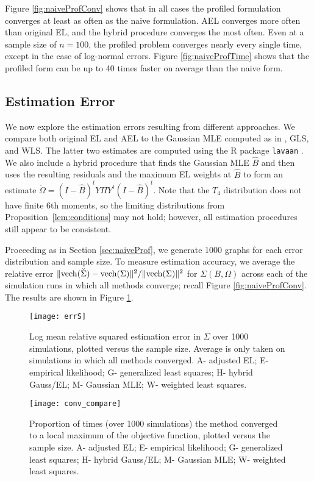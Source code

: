 \documentclass[notitlepage]{article}
\newcommand{\ve}{{\rm vech}}       %
\begin{document}
Figure \ref{fig:naiveProfConv} shows that in all cases the profiled
formulation converges at least as often as the naive formulation.  AEL
converges more often than original EL, and the hybrid procedure converges
the most often.  Even at a sample size of $n =100$, the profiled
problem converges nearly every single time, except in the case of
log-normal errors. Figure \ref{fig:naiveProfTime} shows that the profiled
form can be up to 40 times faster on average than the naive form.


\subsection{Estimation Error}

We now explore the estimation errors resulting from different
approaches.  We compare both original EL and AEL to the Gaussian MLE
computed as in \cite{drton2009computing}, GLS, and WLS.  The latter
two estimates are computed using the R package \texttt{lavaan}
\citep{lavaan}.  We also include a hybrid procedure that finds the
Gaussian MLE $\hat B$ and then uses the resulting residuals and the
maximum EL weights at $\hat B$ to form an estimate
$\check \Omega = (I - \hat B)^t Y \Pi Y ^t(I - \hat B)^t$.  Note that
the $T_4$ distribution does not have finite 6th moments, so the
limiting distributions from Proposition~\ref{lem:conditions} may not
hold; however, all estimation procedures still appear to be
consistent.

Proceeding as in Section \ref{sec:naiveProf}, we generate 1000 graphs
for each error distribution and sample size.  To measure estimation
accuracy, we average the relative error
$\Vert \ve(\check \Sigma) - \ve(\Sigma) \Vert^2/\Vert
  \ve(\Sigma)\Vert^2$ for $\Sigma(B, \Omega)$ across each of the
simulation runs in which all methods converge; recall Figure
\ref{fig:naiveProfConv}.  The results are shown in Figure
\ref{fig:msqe}.

\begin{figure}[htbp]
\centering
\texttt{[image: errS]}
\caption{\label{fig:msqe}Log mean relative squared estimation error in $\Sigma$ over 1000 simulations, plotted versus the
    sample size. Average is only taken on simulations in which all methods converged. A- adjusted EL; E- empirical likelihood; G- generalized least squares; H- hybrid Gauss/EL; M- Gaussian MLE; W- weighted least squares.}
\end{figure}

\begin{figure}[htbp]
\centering
\texttt{[image: conv\_compare]}
\caption{\label{fig:compareConv}Proportion of times (over 1000 simulations) the method converged to a local maximum of the objective function, plotted versus the
    sample size. A- adjusted EL; E- empirical likelihood; G- generalized least squares; H- hybrid Gauss/EL; M- Gaussian MLE; W- weighted least squares.}
\end{figure}
\end{document}
